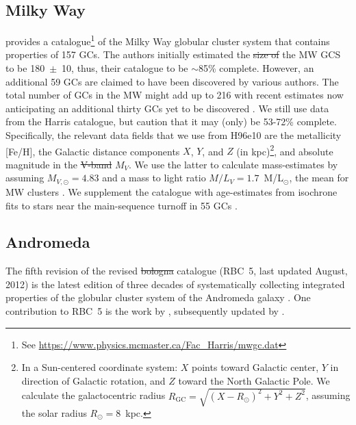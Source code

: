 \documentclass[a4paper,fleqn,usenatbib]{mnras}
\providecommand{\DIFadd}[1]{{\protect\color{blue}\uwave{#1}}} %
\providecommand{\DIFdel}[1]{{\protect\color{red}\sout{#1}}}                      %
\providecommand{\DIFaddbegin}{} %
\providecommand{\DIFaddend}{} %
\providecommand{\DIFdelbegin}{} %
\providecommand{\DIFdelend}{} %
\newcommand{\DIFscaledelfig}{0.5}
\newlength{\DIFdelgraphicswidth} %
\newlength{\DIFdelgraphicsheight} %
\newcommand{\DIFaddincludegraphics}[2][]{{\color{blue}\fbox{\DIFOincludegraphics[#1]{#2}}}} %
\newcommand{\DIFdelincludegraphics}[2][]{%
\sbox{\DIFdelgraphicsbox}{\DIFOincludegraphics[#1]{#2}}%
\settoboxwidth{\DIFdelgraphicswidth}{\DIFdelgraphicsbox} %
\settoboxtotalheight{\DIFdelgraphicsheight}{\DIFdelgraphicsbox} %
\scalebox{\DIFscaledelfig}{%
\parbox[b]{\DIFdelgraphicswidth}{\usebox{\DIFdelgraphicsbox}\\[-\baselineskip] \rule{\DIFdelgraphicswidth}{0em}}\llap{\resizebox{\DIFdelgraphicswidth}{\DIFdelgraphicsheight}{%
\setlength{\unitlength}{\DIFdelgraphicswidth}%
\begin{picture}(1,1)%
\thicklines\linethickness{2pt} %
{\color[rgb]{1,0,0}\put(0,0){\framebox(1,1){}}}%
{\color[rgb]{1,0,0}\put(0,0){\line( 1,1){1}}}%
{\color[rgb]{1,0,0}\put(0,1){\line(1,-1){1}}}%
\end{picture}%
}\hspace*{3pt}}} %
} %
\DeclareRobustCommand{\DIFaddbegin}{\DIFOaddbegin \let\includegraphics\DIFaddincludegraphics} %
\DeclareRobustCommand{\DIFaddend}{\DIFOaddend \let\includegraphics\DIFOincludegraphics} %
\DeclareRobustCommand{\DIFdelbegin}{\DIFOdelbegin \let\includegraphics\DIFdelincludegraphics} %
\DeclareRobustCommand{\DIFdelend}{\DIFOaddend \let\includegraphics\DIFOincludegraphics} %
\begin{document}
\subsection{Milky Way}
\label{sec:milkyway}
\citet[][2010 edition; hereafter H96e10]{1996AJ....112.1487H} provides a
catalogue\footnote{See \url{https://www.physics.mcmaster.ca/Fac_Harris/mwgc.dat}}
of the Milky Way globular cluster system that contains properties of 157 GCs. 
The authors initially estimated the \DIFdelbegin \DIFdel{size of }\DIFdelend \DIFaddbegin \DIFadd{number of GCs in }\DIFaddend the MW GCS to be 180~$\pm$~10,
thus, their catalogue to be ${\sim}$85\% complete. However, an additional 59 GCs
are claimed to have been discovered by various authors. The total number of GCs
in the MW might add up to 216 with recent estimates now anticipating an additional 
thirty GCs yet to be discovered \citep[e.g.][and references therein]{2018ApJ...863L..38R}.
We still use data from the Harris catalogue, but caution that it may (only) be
53-72\% complete. Specifically, the relevant data fields that we use from H96e10
are the metallicity [Fe/H], the Galactic distance components $X$, $Y$, and $Z$ (in
kpc)\footnote{In a Sun-centered coordinate system: $X$ points toward Galactic
center, $Y$ in direction of Galactic rotation, and $Z$ toward the North Galactic
Pole. We calculate the galactocentric radius \DIFdelbegin \DIFdel{$R_{\text{GC}}=\sqrt{(X-R_\odot)^2
+ Y^2 + Z^2}$}\DIFdelend \DIFaddbegin \DIFadd{$R_{\text{gal}}=\sqrt{(X-R_\odot)^2
+ Y^2 + Z^2}$}\DIFaddend , assuming the solar radius $R_\odot=8$~kpc.}, and absolute
magnitude in the \DIFdelbegin \DIFdel{V-band }\DIFdelend \DIFaddbegin \DIFadd{V~band }\DIFaddend $M_V$. We use the latter to calculate mass-estimates by
assuming $M_{V,\odot}=4.83$ and a mass to light ratio $M/L_V = 1.7$~M/L$_{\odot}$,
the mean for MW clusters \citep{2005ApJS..161..304M}. We supplement the catalogue
with age-estimates from isochrone fits to stars near the main-sequence turnoff 
in 55 GCs \citep[][hereafter V13]{2013ApJ...775..134V}.


\subsection{Andromeda}
\label{sec:andromeda}
The fifth revision of the revised \DIFdelbegin \DIFdel{bologna }\DIFdelend \DIFaddbegin \DIFadd{Bologna }\DIFaddend catalogue (RBC~5, last updated
August, 2012) is the latest edition of three decades of systematically
collecting integrated properties of the globular cluster system of the
Andromeda galaxy \citep[][and references therein]{2004A&A...416..917G}. One
contribution to RBC~5 is the work by \citet[][hereafter C11]{2011AJ....141...61C},
subsequently updated by \citet[][hereafter CR16]{2016ApJ...824...42C}.
\end{document}
